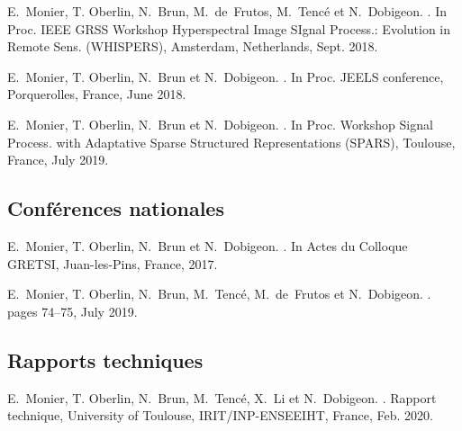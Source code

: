 \begin{fullwidth}
        E.~Monier, T. Oberlin, N.~Brun, M.~de~Frutos, M.~Tenc\'e et N.~Dobigeon.
        .
        \newblock In Proc. IEEE GRSS Workshop Hyperspectral Image SIgnal Process.:
          Evolution in Remote Sens. (WHISPERS), Amsterdam, Netherlands, Sept. 2018.

        E.~Monier, T. Oberlin, N.~Brun et N.~Dobigeon.
        .
        \newblock In Proc. JEELS conference, Porquerolles, France, June 2018.

        E.~Monier, T. Oberlin, N.~Brun et N.~Dobigeon.
        .
        \newblock In Proc. Workshop Signal Process. with Adaptative Sparse Structured
          Representations (SPARS), Toulouse, France, July 2019.

    
    \subsection*{Conférences nationales}  
    

        E.~Monier, T. Oberlin, N.~Brun et N.~Dobigeon.
        .
        \newblock In Actes du Colloque GRETSI, Juan-les-Pins, France, 2017.

        E.~Monier, T. Oberlin, N.~Brun, M.~Tenc\'e, M.~de~Frutos et N.~Dobigeon.
        .
        \newblock pages 74--75, July 2019.


    
    \subsection*{Rapports techniques}


        E.~Monier, T. Oberlin, N.~Brun, M.~Tenc\'e, X.~Li et N.~Dobigeon.
        .
        \newblock Rapport technique, University of Toulouse, IRIT/INP-ENSEEIHT, France,
          Feb. 2020.




\end{fullwidth}